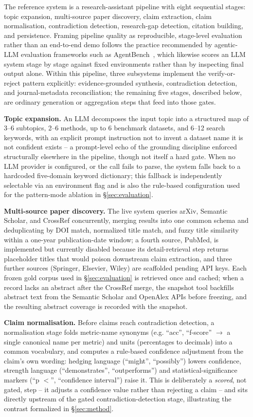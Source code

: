 \documentclass[11pt]{article}
\begin{document}
The reference system is a research-assistant pipeline with eight sequential stages: topic expansion, multi-source paper discovery, claim extraction, claim normalisation, contradiction detection, research-gap detection, citation building, and persistence. Framing pipeline quality as reproducible, stage-level evaluation rather than an end-to-end demo follows the practice recommended by agentic-LLM evaluation frameworks such as AgentBench~\cite{liu2024agentbench}, which likewise scores an LLM system stage by stage against fixed environments rather than by inspecting final output alone. Within this pipeline, three subsystems implement the verify-or-reject pattern explicitly: evidence-grounded synthesis, contradiction detection, and journal-metadata reconciliation; the remaining five stages, described below, are ordinary generation or aggregation steps that feed into those gates.

\textbf{Topic expansion.} An LLM decomposes the input topic into a structured map of 3--6 subtopics, 2--6 methods, up to 6 benchmark datasets, and 6--12 search keywords, with an explicit prompt instruction not to invent a dataset name it is not confident exists -- a prompt-level echo of the grounding discipline enforced structurally elsewhere in the pipeline, though not itself a hard gate. When no LLM provider is configured, or the call fails to parse, the system falls back to a hardcoded five-domain keyword dictionary; this fallback is independently selectable via an environment flag and is also the rule-based configuration used for the pattern-mode ablation in \S\ref{sec:evaluation}.

\textbf{Multi-source paper discovery.} The live system queries arXiv, Semantic Scholar, and CrossRef concurrently, merging results into one common schema and deduplicating by DOI match, normalized title match, and fuzzy title similarity within a one-year publication-date window; a fourth source, PubMed, is implemented but currently disabled because its detail-retrieval step returns placeholder titles that would poison downstream claim extraction, and three further sources (Springer, Elsevier, Wiley) are scaffolded pending API keys. Each frozen gold corpus used in \S\ref{sec:evaluation} is retrieved once and cached; when a record lacks an abstract after the CrossRef merge, the snapshot tool backfills abstract text from the Semantic Scholar and OpenAlex APIs before freezing, and the resulting abstract coverage is recorded with the snapshot.

\textbf{Claim normalisation.} Before claims reach contradiction detection, a normalisation stage folds metric-name synonyms (e.g. ``acc'', ``f-score'' $\to$ a single canonical name per metric) and units (percentages to decimals) into a common vocabulary, and computes a rule-based confidence adjustment from the claim's own wording: hedging language (``might'', ``possibly'') lowers confidence, strength language (``demonstrates'', ``outperforms'') and statistical-significance markers (``p $<$'', ``confidence interval'') raise it. This is deliberately a \emph{scored}, not gated, step -- it adjusts a confidence value rather than rejecting a claim -- and sits directly upstream of the gated contradiction-detection stage, illustrating the contrast formalized in \S\ref{sec:method}.
\end{document}
